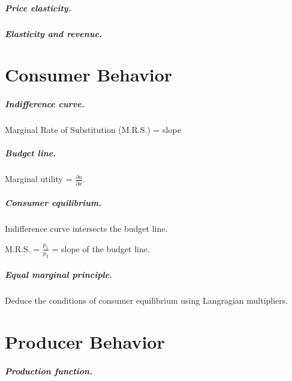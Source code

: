 \documentclass[12pt,english,oneside]{scrbook}
\numberwithin{equation}{chapter}
\theoremstyle{definition}
\theoremstyle{plain}
\begin{document}
\paragraph{Price elasticity.}

\paragraph{Elasticity and revenue.}




\chapter{Consumer Behavior}

\paragraph{Indifference curve.}

Marginal Rate of Substitution (M.R.S.) = slope

\paragraph{Budget line.}

Marginal utility = $\displaystyle\frac{\partial u}{\partial x}$.

\paragraph{Consumer equilibrium.}

Indifference curve intersects the budget line.

M.R.S. = $\displaystyle\frac{p_1}{p_2}$ = slope of the budget line.

\paragraph{Equal marginal principle.}

Deduce the conditions of consumer equilibrium using Langragian multipliers.

\chapter{Producer Behavior}

\paragraph{Production function.}
\end{document}
